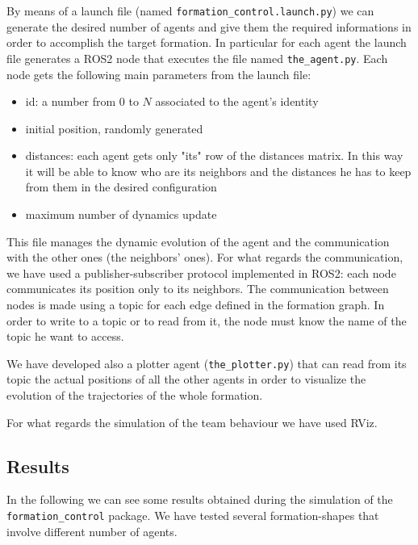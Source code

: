 \documentclass[a4paper,11pt,oneside]{book}
\begin{document}
\bigskip
By means of a launch file (named \texttt{formation\_control.launch.py}) we can generate the desired number of agents and give them the required informations in order to accomplish the target formation. In particular for each agent the launch file generates a ROS2 node that executes the file named \texttt{the\_agent.py}. Each node gets the following main parameters from the launch file:
\begin{itemize}
\item id: a number from $0$ to $N$ associated to the agent's identity
\item initial position, randomly generated
\item distances: each agent gets only "its" row of the distances matrix. In this way it will be able to know who are its neighbors and the distances he has to keep from them in the desired configuration
\item maximum number of dynamics update
\end{itemize}
This file manages the dynamic evolution of the agent and the communication with the other ones (the neighbors' ones). For what regards the communication, we have used a publisher-subscriber protocol implemented in ROS2: each node communicates its position only to its neighbors. The communication between nodes is made using a topic for each edge defined in the formation graph. In order to write to a topic or to read from it, the node must know the name of the topic he want to access.

\bigskip
We have developed also a plotter agent (\texttt{the\_plotter.py}) that can read from its topic the actual positions of all the other agents in order to visualize the evolution of the trajectories of the whole formation.

For what regards the simulation of the team behaviour we have used RViz.

\subsection{Results}
In the following we can see some results obtained during the simulation of the \texttt{formation\_control} package. 
We have tested several formation-shapes that involve different number of agents.
\end{document}
